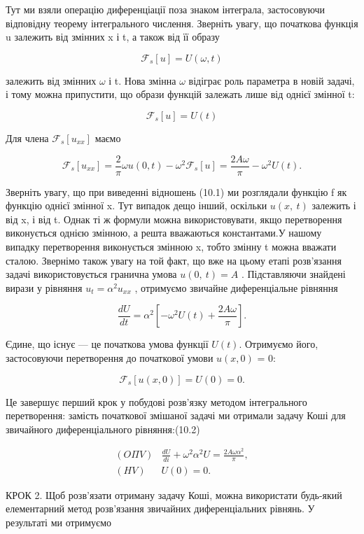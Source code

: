 \documentclass[
  ukrainian,
]{article}
\begin{document}
Тут ми взяли операцію диференціації поза знаком інтеграла, застосовуючи
відповідну теорему інтегрального числення. Зверніть увагу, що початкова
функція u залежить від змінних x і t, а також від її образу

\[
\mathcal{F}_{s}[u] = U(\omega, t)
\]

залежить від змінних \(\omega\) і t. Нова змінна \(\omega\) відіграє
роль параметра в новій задачі, і тому можна припустити, що образи
функцій залежать лише від однієї змінної t:

\[
\mathcal{F}_s[u] = U(t)
\]

Для члена \(\mathcal{F}_s[u_{xx}]\) маємо

\[
\mathcal{F}_s[u_{xx}] = \frac{2}{\pi}\omega u(0,t) - \omega^2 \mathcal{F}_s[u]
= \frac{2A\omega}{\pi} - \omega^2 U(t).
\]

Зверніть увагу, що при виведенні відношень (10.1) ми розглядали функцію
f як функцію однієї змінної x. Тут випадок дещо інший, оскільки
\(u\left(x,\ t\right)\) залежить і від x, і від t. Однак ті ж формули
можна використовувати, якщо перетворення виконується однією змінною, а
решта вважаються константами.У нашому випадку перетворення виконується
змінною x, тобто змінну t можна вважати сталою. Звернімо також увагу на
той факт, що вже на цьому етапі розв'язання задачі використовується
гранична умова \(u\left(0,\ t\right)=A\) . Підставляючи знайдені вирази
у рівняння \(u_{t}=\alpha^{2}u_{xx}\) , отримуємо звичайне
диференціальне рівняння

\[
\frac{dU}{dt} = \alpha^2 \left[ -\omega^2 U(t) + \frac{2A\omega}{\pi} \right].
\]

Єдине, що існує --- це початкова умова функції \(U(t)\). Отримуємо його,
застосовуючи перетворення до початкової умови \(u(x, 0)\) = 0:

\[
\mathcal{F}_{s}[u(x, 0)] = U(0) = 0.
\]

Це завершує перший крок у побудові розв'язку методом інтегрального
перетворення: замість початкової змішаної задачі ми отримали задачу Коші
для звичайного диференціального рівняння:(10.2)

\[
\begin{aligned} (O \Pi V) & \frac{dU}{di} + \omega^2 \alpha^2 U = \frac{2A\omega \alpha^2}{\pi}, \\ (H V) & U(0) = 0. \end{aligned}
\]

КРОК 2. Щоб розв'язати отриману задачу Коші, можна використати будь-який
елементарний метод розв'язання звичайних диференціальних рівнянь. У
результаті ми отримуємо
\end{document}
